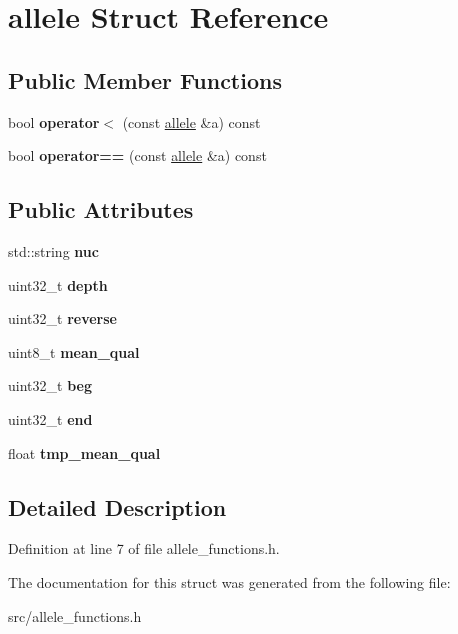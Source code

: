 \hypertarget{structallele}{}\section{allele Struct Reference}
\label{structallele}
\subsection*{Public Member Functions}
\begin{DoxyCompactItemize}
\item 
\mbox{\label{structallele_a502cacd33b94d11fa9115e9c10fd5cfa}} 
bool {\bfseries operator$<$} (const \mbox{\hyperlink{structallele}{allele}} \&a) const
\item 
\mbox{\label{structallele_a024eb5a0fa32f0b8ada7c0fa161c922a}} 
bool {\bfseries operator==} (const \mbox{\hyperlink{structallele}{allele}} \&a) const
\end{DoxyCompactItemize}
\subsection*{Public Attributes}
\begin{DoxyCompactItemize}
\item 
\mbox{\label{structallele_a2d7d7e7ab126f0881e8a43efdfef9532}} 
std\+::string {\bfseries nuc}
\item 
\mbox{\label{structallele_aa1d12eec365c400a111ed2e985eec0b2}} 
uint32\+\_\+t {\bfseries depth}
\item 
\mbox{\label{structallele_af6966ddc48e2badf26b335f1b1117572}} 
uint32\+\_\+t {\bfseries reverse}
\item 
\mbox{\label{structallele_a17706ec2e654e9d204df2c1a5e339ecd}} 
uint8\+\_\+t {\bfseries mean\+\_\+qual}
\item 
\mbox{\label{structallele_ac36e3baa57a1260c3341665c6a154dff}} 
uint32\+\_\+t {\bfseries beg}
\item 
\mbox{\label{structallele_a0a45a966a4ece36f7ff976ad0acfd522}} 
uint32\+\_\+t {\bfseries end}
\item 
\mbox{\label{structallele_a78d589bef95df9b22e506d880e9179a2}} 
float {\bfseries tmp\+\_\+mean\+\_\+qual}
\end{DoxyCompactItemize}


\subsection{Detailed Description}


Definition at line 7 of file allele\+\_\+functions.\+h.



The documentation for this struct was generated from the following file\+:\begin{DoxyCompactItemize}
\item 
src/allele\+\_\+functions.\+h\end{DoxyCompactItemize}
